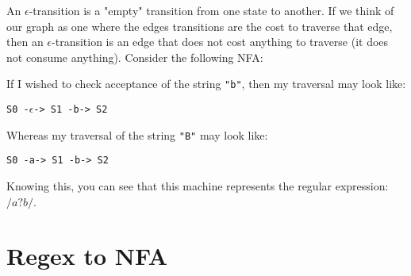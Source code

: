 \documentclass[main.tex]{subfiles}
\begin{document}
An $\epsilon$-transition is a "empty" transition from one state to another. If we think of our graph as one where the edges transitions are the cost to traverse that edge, then an $\epsilon$-transition is an edge that does not cost anything to traverse (it does not consume anything). Consider the following NFA:
\begin{center}
\end{center}
If I wished to check acceptance of the string \texttt{"b"}, then my traversal may look like:
\begin{center}
    \texttt{S0 -$\epsilon$-> S1 -b-> S2}
\end{center}
Whereas my traversal of the string \texttt{"B"} may look like:
\begin{center}
    \texttt{S0 -a-> S1 -b-> S2}
\end{center}
Knowing this, you can see that this machine represents the regular expression: $/a?b/$.

\section{Regex to NFA}
\end{document}
